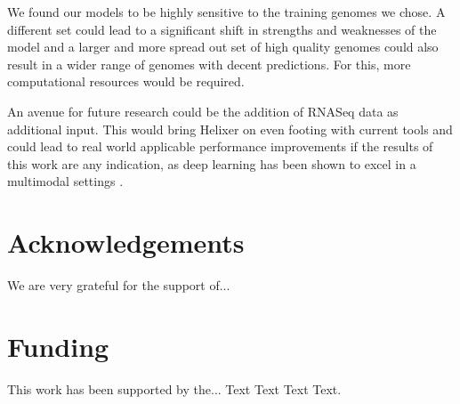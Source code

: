 \documentclass{bioinfo}
\begin{document}
We found our models to be highly sensitive to the training genomes we chose. A different set could lead to a significant shift in strengths and weaknesses of the model and a larger and more spread out set of high quality genomes could also result in a wider range of genomes with decent predictions. For this, more computational resources would be required. 

An avenue for future research could be the addition of RNASeq data as additional input. This would bring Helixer on even footing with current tools and could lead to real world applicable performance improvements if the results of this work are any indication, as deep learning has been shown to excel in a multimodal settings \citep{ching2018opportunities}.

\section*{Acknowledgements}

We are very grateful for the support of...

\section*{Funding}

This work has been supported by the... Text Text  Text Text.\vspace*{-12pt}



\end{document}
